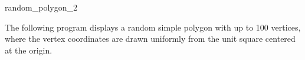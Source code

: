 \begin{ccRefFunction}{random_polygon_2}
\ccExample

The following program displays a random simple polygon with up to 100
vertices, where the vertex coordinates are drawn uniformly from the 
unit square centered at the origin.


\end{ccRefFunction}
